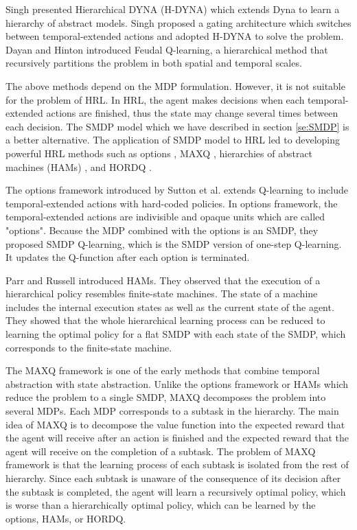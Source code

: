Singh \cite{Singh92} presented Hierarchical DYNA (H-DYNA) which extends Dyna
to learn a hierarchy of abstract models. Singh proposed a gating architecture which switches
between temporal-extended actions and adopted H-DYNA to solve the problem. 
Dayan and Hinton \cite{Dayan95} introduced Feudal Q-learning, a hierarchical method that
recursively partitions the problem in both spatial and temporal scales. 

The above methods depend on the MDP formulation. However, it is not suitable for the problem of HRL.
In HRL, the agent makes decisions when each temporal-extended actions are finished, thus the state
may change several times between each decision. The SMDP model which we have described
in section \ref{se:SMDP} is a better alternative. The application of SMDP model
to HRL led to developing powerful HRL methods such as options \cite{SMDP},
MAXQ \cite{MaxQJ}, hierarchies of abstract machines (HAMs) \cite{HAMQ}, and 
HORDQ \cite{HORDQ}.

The options framework introduced by Sutton et al. \cite{SMDP} extends
Q-learning to include temporal-extended actions with hard-coded policies.
In options framework, the temporal-extended actions are indivisible and opaque units which are called "options".
Because the MDP combined with the options is an SMDP, they proposed SMDP Q-learning, which is
the SMDP version of one-step Q-learning. It updates the Q-function after each option is terminated.

Parr and Russell \cite{HAMQ} introduced HAMs. They observed that the execution of a hierarchical policy
resembles finite-state machines. The state of a machine includes the internal execution states as well as
the current state of the agent. They showed that the whole hierarchical learning process can be reduced to
learning the optimal policy for a flat SMDP with each state of the SMDP, which corresponds to the finite-state machine.

The MAXQ framework is one of the early methods that combine temporal abstraction with state abstraction.
Unlike the options framework or HAMs which reduce the problem to a single SMDP, MAXQ decomposes
the problem into several MDPs. Each MDP corresponds to a subtask in the hierarchy.
The main idea of MAXQ is to decompose the value function into the expected reward that
the agent will receive after an action is finished and the expected reward that
the agent will receive on the completion of a subtask. 
The problem of MAXQ framework is that the learning process of each subtask 
is isolated from the rest of hierarchy. Since each subtask is unaware
of the consequence of its decision after the subtask is completed, 
the agent will learn a recursively optimal policy, which is worse than
a hierarchically optimal policy, which can be learned by the options, HAMs, or HORDQ.

